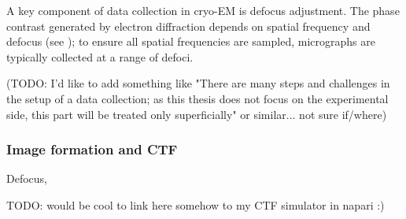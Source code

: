 A key component of data collection in cryo-EM is defocus adjustment. The phase contrast generated by electron diffraction depends on spatial frequency and defocus (see ); to ensure all spatial frequencies are sampled, micrographs are typically collected at a range of defoci.

(TODO: I'd like to add something like "There are many steps and challenges in the setup of a data collection; as this thesis does not focus on the experimental side, this part will be treated only superficially" or similar... not sure if/where)

\subsubsection{Image formation and CTF}\label{image_formation}

Defocus, 

TODO: would be cool to link here somehow to my CTF simulator in napari :)

